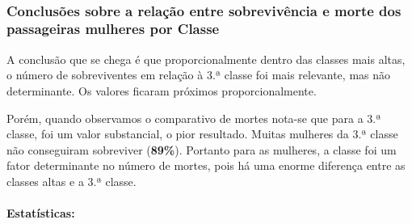 \documentclass[11pt]{article}
\begin{document}
    \begin{center}
    \end{center}
    { \hspace*{\fill} \\}
    
    \subsubsection{Conclusões sobre a relação entre sobrevivência e morte
dos passageiras mulheres por
Classe}\label{conclusuxf5es-sobre-a-relauxe7uxe3o-entre-sobrevivuxeancia-e-morte-dos-passageiras-mulheres-por-classe}

A conclusão que se chega é que proporcionalmente dentro das classes mais
altas, o número de sobreviventes em relação à 3.ª classe foi mais
relevante, mas não determinante. Os valores ficaram próximos
proporcionalmente.

Porém, quando observamos o comparativo de mortes nota-se que para a 3.ª
classe, foi um valor substancial, o pior resultado. Muitas mulheres da
3.ª classe não conseguiram sobreviver (\textbf{89\%}). Portanto para as
mulheres, a classe foi um fator determinante no número de mortes, pois
há uma enorme diferença entre as classes altas e a 3.ª classe.

\paragraph{Estatísticas:}\label{estatuxedsticas}
\end{document}
